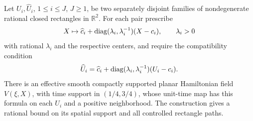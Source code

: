 \begin{lemma}\label{lem:sa-autonomous-extension}
Let $U_i,\widehat U_i$, $1\le i\le J$, $J\ge1$, be two separately
disjoint families of nondegenerate rational closed rectangles in
$\mathbb R^2$.  For each pair prescribe
\[
 X\mapsto\widehat c_i+
       \operatorname{diag}(\lambda_i,\lambda_i^{-1})(X-c_i),\qquad\lambda_i>0
\]
with rational $\lambda_i$ and the respective centers, and require the
compatibility condition
\[
 \widehat U_i=\widehat c_i+
       \operatorname{diag}(\lambda_i,\lambda_i^{-1})(U_i-c_i).
\]
There is an effective smooth compactly supported planar Hamiltonian
field $V(\xi,X)$, with time support in $(1/4,3/4)$, whose unit-time
map has this formula on each $U_i$ and a positive neighborhood.
The construction gives a rational bound on its spatial support and all
controlled rectangle paths.
\end{lemma}
